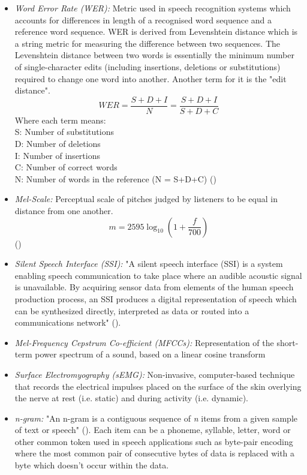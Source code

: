 \begin{itemize}
  \item \emph{Word Error Rate (WER):}
  Metric used in speech recognition systems which accounts for differences in length of
  a recognised word sequence and a reference word sequence. WER is derived from
  Levenshtein distance  which is a string metric for measuring the difference between two
  sequences. The Levenshtein distance between two words is essentially the minimum number of
  single-character edits (including insertions, deletions or substitutions) required to
  change one word into another. Another term for it is the "edit distance".
  \[
    WER
    = \dfrac{S + D + I}{N}
    = \dfrac{S + D + I}{S + D + C}
  \]
  Where each term means:\\
  S: Number of substitutions\\
  D: Number of deletions\\
  I: Number of insertions\\
  C: Number of correct words\\
  N: Number of words in the reference (N = S+D+C)
  (\cite{1966SPhD...10..707L})
  \item \emph{Mel-Scale:}
  Perceptual scale of pitches judged by listeners to be equal in distance from one another.
  \[ m = 2595 \log_{10} \left(1 + \dfrac{f}{700}\right) \]
  (\cite{mel_scale_formula})
  \item \emph{Silent Speech Interface (SSI):}
  "A silent speech interface (SSI) is a system enabling speech communication to take
  place where an audible acoustic signal is unavailable. By acquiring sensor data from
  elements of the human speech production process, an SSI produces a digital representation
  of speech which can be synthesized directly, interpreted as data or routed into a communications
  network" (\cite{ssi_definition}).
  \item \emph{Mel-Frequency Cepstrum Co-efficient (MFCCs):}
  Representation of the short-term power spectrum of a sound, based on a linear cosine transform
  \item \emph{Surface Electromyography (sEMG):}
  Non-invasive, computer-based technique that records the electrical impulses placed on the surface
  of the skin overlying the nerve at rest (i.e. static) and during activity (i.e. dynamic).
  \item \emph{n-gram:}
  "An n-gram is a contiguous sequence of \textit{n} items from a given sample of text or speech"
  (\cite{n_gram_def}). Each item can be a phoneme, syllable, letter, word or other common token
  used in speech applications such as byte-pair encoding where the most common pair of consecutive
  bytes of data is replaced with a byte which doesn't occur within the data.
\end{itemize}

